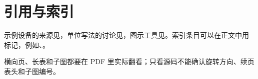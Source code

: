 \section{引用与索引}

示例设备的来源见\cite{example2026}，单位写法的讨论见\cite{unit2025}，图示工具见\cite{tikz2026}。索引条目可以在正文中用  标记，例如、。

\begin{tcolorbox}[bookbox,title=注意]
  横向页、长表和子图都要在 PDF 里实际翻看；只看源码不能确认旋转方向、续页表头和子图编号。
\end{tcolorbox}
